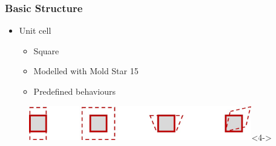 \documentclass[serif, pdf]{beamer}
\begin{document}

\begin{frame}
    \frametitle{Basic Structure}
    \begin{itemize}
        \item<1-> Unit cell
        \changefontsizes{11pt}
        \begin{itemize}
            \item<2-> Square
            \item<3-> Modelled with Mold Star 15
            \item<4-> Predefined behaviours
        \end{itemize}
    \end{itemize}
    \begin{figure}
        \centering
        \includegraphics[height = 1.5cm]{Unit_Cell_Deformation.jpg}<4->
    \end{figure}
\end{frame}

\end{document}
